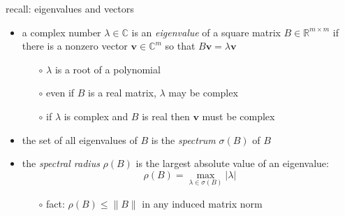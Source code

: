\documentclass[10pt,hyperref]{beamer}
\newcommand{\bv}{\mathbf{v}}
\newcommand{\CC}{\mathbb{C}}
\newcommand{\RR}{\mathbb{R}}
\begin{document}
\begin{frame}{recall: eigenvalues and vectors}

\begin{itemize}
\item a complex number $\lambda \in \CC$ is an \emph{eigenvalue} of a square matrix $B\in\RR^{m\times m}$ if there is a nonzero vector $\bv\in\CC^m$ so that $B \bv = \lambda \bv$
  \begin{itemize}
  \item[$\circ$] $\lambda$ is a root of a polynomial
  \item[$\circ$] even if $B$ is a real matrix, $\lambda$ may be complex
  \item[$\circ$] if $\lambda$ is complex and $B$ is real then $\bv$ must be complex
  \end{itemize}
\item the set of all eigenvalues of $B$ is the \emph{spectrum} $\sigma(B)$ of $B$
\item the \emph{spectral radius} $\rho(B)$ is the largest absolute value of an eigenvalue:
    $$\rho(B) = \max_{\lambda\in\sigma(B)}  |\lambda|$$

  \begin{itemize}
  \item[$\circ$] fact: $\rho(B) \le \|B\|$ in any induced matrix norm
  \end{itemize}
\end{itemize}
\end{frame}
\end{document}
